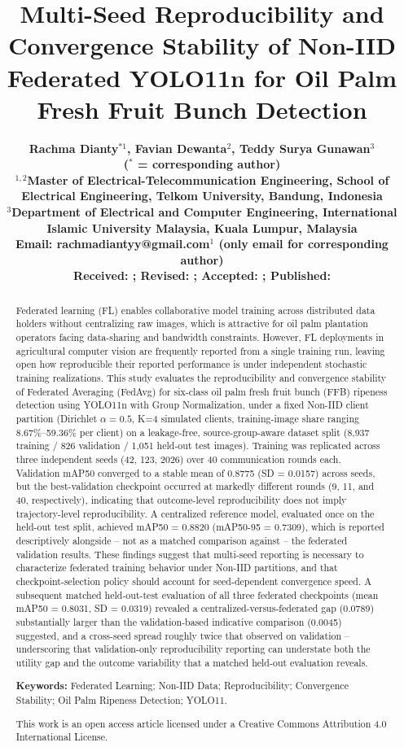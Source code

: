 \documentclass[11pt]{article}
\title{\vspace{-1.5em}\fontsize{14}{17}\selectfont\bfseries Multi-Seed Reproducibility and Convergence Stability of Non-IID Federated YOLO11n for Oil Palm Fresh Fruit Bunch Detection}
\author{
  \bfseries\fontsize{10}{12}\selectfont Rachma Dianty$^{*1}$, Favian Dewanta$^{2}$, Teddy Surya Gunawan$^{3}$ \\
  \normalfont\small ($^{*}$ = corresponding author) \\
  \small $^{1,2}$Master of Electrical-Telecommunication Engineering, School of Electrical Engineering, Telkom University, Bandung, Indonesia \\
  \small $^{3}$Department of Electrical and Computer Engineering, International Islamic University Malaysia, Kuala Lumpur, Malaysia \\
  \small Email: rachmadiantyy@gmail.com$^{1}$ (only email for corresponding author) \\
  \small Received: \editorialtbd; Revised: \editorialtbd; Accepted: \editorialtbd; Published: \editorialtbd
}
\date{}
\begin{document}
\maketitle
\thispagestyle{fancy}

\begin{abstract}
\noindent
Federated learning (FL) enables collaborative model training across distributed data holders without centralizing raw images, which is attractive for oil palm plantation operators facing data-sharing and bandwidth constraints. However, FL deployments in agricultural computer vision are frequently reported from a single training run, leaving open how reproducible their reported performance is under independent stochastic training realizations. This study evaluates the reproducibility and convergence stability of Federated Averaging (FedAvg) for six-class oil palm fresh fruit bunch (FFB) ripeness detection using YOLO11n with Group Normalization, under a fixed Non-IID client partition (Dirichlet $\alpha=0.5$, K=4 simulated clients, training-image share ranging 8.67\%--59.36\% per client) on a leakage-free, source-group-aware dataset split (8,937 training / 826 validation / 1,051 held-out test images). Training was replicated across three independent seeds (42, 123, 2026) over 40 communication rounds each. Validation mAP50 converged to a stable mean of 0.8775 (SD = 0.0157) across seeds, but the best-validation checkpoint occurred at markedly different rounds (9, 11, and 40, respectively), indicating that outcome-level reproducibility does not imply trajectory-level reproducibility. A centralized reference model, evaluated once on the held-out test split, achieved mAP50 = 0.8820 (mAP50-95 = 0.7309), which is reported descriptively alongside -- not as a matched comparison against -- the federated validation results. These findings suggest that multi-seed reporting is necessary to characterize federated training behavior under Non-IID partitions, and that checkpoint-selection policy should account for seed-dependent convergence speed. A subsequent matched held-out-test evaluation of all three federated checkpoints (mean mAP50 = 0.8031, SD = 0.0319) revealed a centralized-versus-federated gap (0.0789) substantially larger than the validation-based indicative comparison (0.0045) suggested, and a cross-seed spread roughly twice that observed on validation -- underscoring that validation-only reproducibility reporting can understate both the utility gap and the outcome variability that a matched held-out evaluation reveals.

\medskip
\noindent\textbf{Keywords:} Federated Learning; Non-IID Data; Reproducibility; Convergence Stability; Oil Palm Ripeness Detection; YOLO11.

\medskip
\noindent\footnotesize This work is an open access article licensed under a Creative Commons Attribution 4.0 International License.
\end{abstract}
\end{document}
